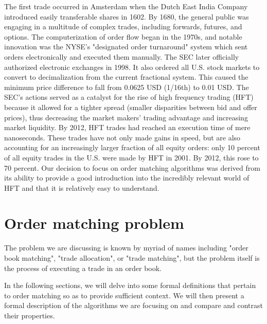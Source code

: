 \documentclass{article}
\begin{document}
The first trade occurred in Amsterdam when the Dutch East India Company introduced easily transferable shares in 1602. By 1680, the general public was engaging in a multitude of complex trades, including forwards, futures, and options. The computerization of order flow began in the 1970s, and notable innovation was the NYSE's "designated order turnaround" system which sent orders electronically and executed them manually. The SEC later officially authorized electronic exchanges in 1998. It also ordered all U.S. stock markets to convert to decimalization from the current fractional system. This caused the minimum price difference to fall from 0.0625 USD (1/16th) to 0.01 USD. The SEC's actions served as a catalyst for the rise of high frequency trading (HFT) because it allowed for a tighter spread (smaller disparities between bid and offer prices), thus decreasing the market makers’ trading advantage and increasing market liquidity. By 2012, HFT trades had reached an execution time of mere nanoseconds. These trades have not only made gains in speed, but are also accounting for an increasingly larger fraction of all equity orders: only 10 percent of all equity trades in the U.S. were made by HFT in 2001. By 2012, this rose to 70 percent. Our decision to focus on order matching algorithms was derived from its ability to provide a good introduction into the incredibly relevant world of HFT and that it is relatively easy to understand.


\section{Order matching problem}
 
The problem we are discussing is known by myriad of names including "order book matching", "trade allocation", or "trade matching", but the problem itself is the process of executing a trade in an order book. 

In the following sections, we will delve into some formal definitions that pertain to order matching so as to provide sufficient context. We will then present a formal description of the algorithms we are focusing on and compare and contrast their properties.  
\end{document}

